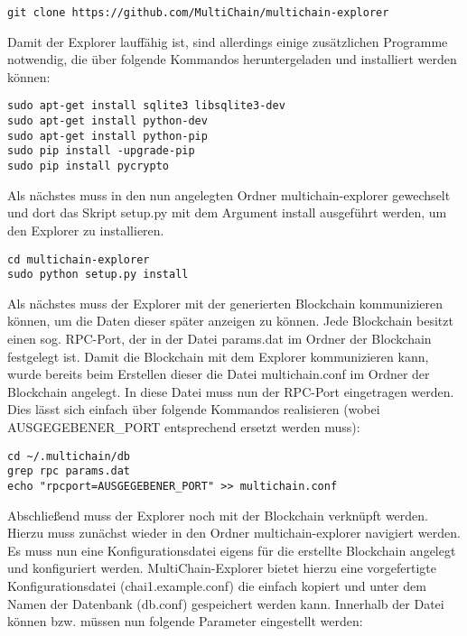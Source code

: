 \begin{lstlisting}[frame=single]
git clone https://github.com/MultiChain/multichain-explorer
\end{lstlisting}

Damit der Explorer lauffähig ist, sind allerdings einige zusätzlichen Programme notwendig, die über folgende Kommandos heruntergeladen und installiert werden können:

\begin{lstlisting}[frame=single]
sudo apt-get install sqlite3 libsqlite3-dev
sudo apt-get install python-dev
sudo apt-get install python-pip
sudo pip install -upgrade-pip
sudo pip install pycrypto
\end{lstlisting}

Als nächstes muss in den nun angelegten Ordner multichain-explorer gewechselt und dort das Skript setup.py mit dem Argument install ausgeführt werden, um den Explorer zu installieren. 

\begin{lstlisting}[frame=single]
cd multichain-explorer
sudo python setup.py install
\end{lstlisting}

Als nächstes muss der Explorer mit der generierten Blockchain kommunizieren können, um die Daten dieser später anzeigen zu können. Jede Blockchain besitzt einen sog. RPC-Port, der in der Datei params.dat im Ordner der Blockchain festgelegt ist. Damit die Blockchain mit dem Explorer kommunizieren kann, wurde bereits beim Erstellen dieser die Datei multichain.conf im Ordner der Blockchain angelegt. In diese Datei muss nun der RPC-Port eingetragen werden. Dies lässt sich einfach über folgende Kommandos realisieren (wobei AUSGEGEBENER\_PORT entsprechend ersetzt werden muss):

\begin{lstlisting}[frame=single]
cd ~/.multichain/db
grep rpc params.dat
echo "rpcport=AUSGEGEBENER_PORT" >> multichain.conf
\end{lstlisting}

Abschließend muss der Explorer noch mit der Blockchain verknüpft werden. Hierzu muss zunächst wieder in den Ordner multichain-explorer navigiert werden. Es muss nun eine Konfigurationsdatei eigens für die erstellte Blockchain angelegt und konfiguriert werden. MultiChain-Explorer bietet hierzu eine vorgefertigte Konfigurationsdatei (chai1.example.conf) die einfach kopiert und unter dem Namen der Datenbank (db.conf) gespeichert werden kann. Innerhalb der Datei können bzw. müssen nun folgende Parameter eingestellt werden:

